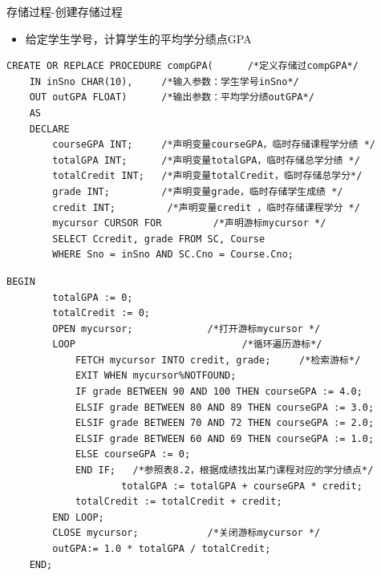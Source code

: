 \begin{frame}{存储过程-创建存储过程}
\begin{itemize}
    \item 给定学生学号，计算学生的平均学分绩点GPA
\end{itemize}
\begin{block}{}
\begin{lstlisting}[linewidth=\linewidth]
CREATE OR REPLACE PROCEDURE compGPA(      /*定义存储过compGPA*/
    IN inSno CHAR(10),     /*输入参数：学生学号inSno*/
    OUT outGPA FLOAT)      /*输出参数：平均学分绩outGPA*/
    AS 
    DECLARE
        courseGPA INT;     /*声明变量courseGPA，临时存储课程学分绩 */
        totalGPA INT;      /*声明变量totalGPA，临时存储总学分绩 */
        totalCredit INT;   /*声明变量totalCredit，临时存储总学分*/
        grade INT;         /*声明变量grade，临时存储学生成绩 */
        credit INT;         /*声明变量credit ，临时存储课程学分 */
        mycursor CURSOR FOR         /*声明游标mycursor */ 
        SELECT Ccredit, grade FROM SC, Course 
        WHERE Sno = inSno AND SC.Cno = Course.Cno;   
\end{lstlisting}
\end{block}
\framebreak
\begin{block}{}
\begin{lstlisting}[firstnumber=15,linewidth=\linewidth]
    BEGIN 
        totalGPA := 0;
        totalCredit := 0;
        OPEN mycursor;             /*打开游标mycursor */
        LOOP                             /*循环遍历游标*/
            FETCH mycursor INTO credit, grade;     /*检索游标*/
            EXIT WHEN mycursor%NOTFOUND;
            IF grade BETWEEN 90 AND 100 THEN courseGPA := 4.0; 
            ELSIF grade BETWEEN 80 AND 89 THEN courseGPA := 3.0; 
            ELSIF grade BETWEEN 70 AND 72 THEN courseGPA := 2.0; 
            ELSIF grade BETWEEN 60 AND 69 THEN courseGPA := 1.0; 
            ELSE courseGPA := 0; 
            END IF;   /*参照表8.2，根据成绩找出某门课程对应的学分绩点*/
                    totalGPA := totalGPA + courseGPA * credit;
            totalCredit := totalCredit + credit;
        END LOOP;
        CLOSE mycursor;            /*关闭游标mycursor */
        outGPA:= 1.0 * totalGPA / totalCredit;
    END;
\end{lstlisting}
\end{block}

\end{frame}


